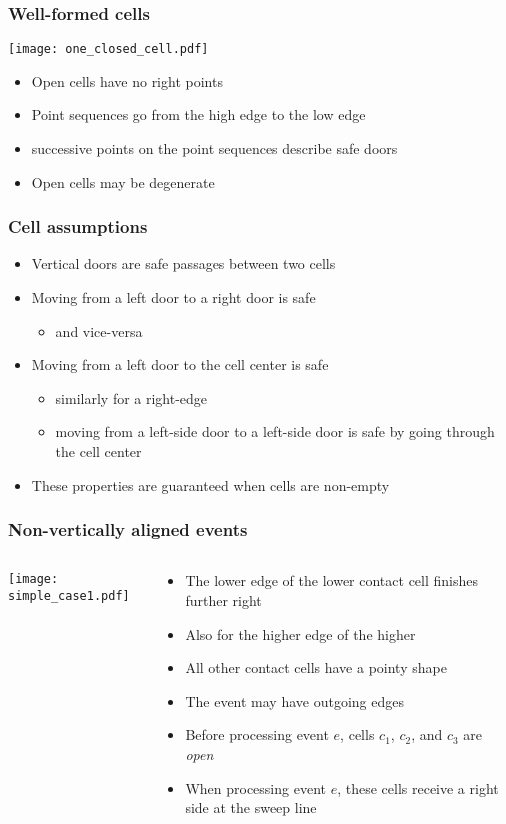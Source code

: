 \documentclass[compress]{beamer}
\begin{document}
\begin{frame}
\frametitle{Well-formed cells}
\texttt{[image: one\_closed\_cell.pdf]}

\begin{itemize}
\item Open cells have no right points
\item Point sequences go from the high edge to the low edge
\item successive points on the point sequences describe safe doors
\item Open cells may be degenerate
\end{itemize}
\end{frame}
\begin{frame}
\frametitle{Cell assumptions}
\begin{itemize}
\item Vertical doors are safe passages between two cells
\item Moving from a left door  to a right door is safe
\begin{itemize}
\item and vice-versa
\end{itemize}
\item Moving from a left door to the cell center is safe
\begin{itemize}
\item similarly for a right-edge
\item moving from a left-side door to a left-side door is
safe by going through the cell center
\end{itemize}
\item These properties are guaranteed when cells are non-empty
\end{itemize}
\end{frame}
\begin{frame}
\frametitle{Non-vertically aligned events}
\begin{columns}
\begin{column}{0.3\textwidth}
{\texttt{[image: simple\_case1.pdf]}}
\end{column}
\begin{column}{0.7\textwidth}
\begin{itemize}
\item The lower edge of the lower contact cell finishes further right
\item Also for the higher edge of the higher
\item All other contact cells have a pointy shape
\item The event may have outgoing edges
\item Before processing event \(e\), cells \(c_1\), \(c_2\), and \(c_3\) are
{\em open}
\item When processing event \(e\), these cells receive a right side at
the sweep line
\end{itemize}
\end{column}
\end{columns}
\end{frame}
\end{document}
